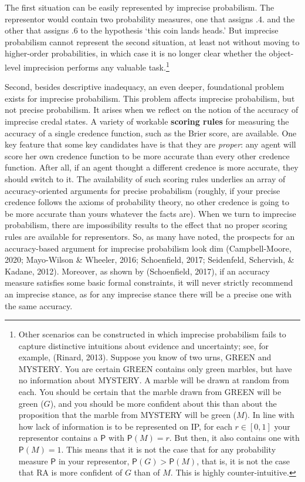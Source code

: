 \documentclass[
  10pt,
  dvipsnames,enabledeprecatedfontcommands]{scrartcl}
\newcommand{\pr}[1]{\mathsf{P}(#1)}
\begin{document}
\noindent The first situation can be easily represented by imprecise
probabilism. The representor would contain two probability measures, one
that assigns .4. and the other that assigns .6 to the hypothesis `this
coin lands heads.' But imprecise probabilism cannot represent the second
situation, at least not without moving to higher-order probabilities, in
which case it is no longer clear whether the object-level imprecision
performs any valuable task.\footnote{Other scenarios can be constructed
  in which imprecise probabilism fails to capture distinctive intuitions
  about evidence and uncertainty; see, for example, (Rinard, 2013).
  Suppose you know of two urns, \textsf{GREEN} and \textsf{MYSTERY}. You
  are certain \textsf{GREEN} contains only green marbles, but have no
  information about \textsf{MYSTERY}. A marble will be drawn at random
  from each. You should be certain that the marble drawn from
  \textsf{GREEN} will be green (\(G\)), and you should be more confident
  about this than about the proposition that the marble from
  \textsf{MYSTERY} will be green (\(M\)). In line with how lack of
  information is to be represented on \textsf{IP}, for each
  \(r\in [0,1]\) your representor contains a \(\mathsf{P}\) with
  \(\pr{M}=r\). But then, it also contains one with \(\pr{M}=1\). This
  means that it is not the case that for any probability measure
  \(\mathsf{P}\) in your representor, \(\mathsf{P}(G) > \mathsf{P}(M)\),
  that is, it is not the case that RA is more confident of \(G\) than of
  \(M\). This is highly counter-intuitive.}

Second, besides descriptive inadequacy, an even deeper, foundational
problem exists for imprecise probabilism. This problem affects imprecise
probabilism, but not precise probabilism. It arises when we reflect on
the notion of the accuracy of imprecise credal states. A variety of
workable \textbf{scoring rules} for measuring the accuracy of a single
credence function, such as the Brier score, are available. One key
feature that some key candidates have is that they are \emph{proper}:
any agent will score her own credence function to be more accurate than
every other credence function. After all, if an agent thought a
different credence is more accurate, they should switch to it. The
availability of such scoring rules underlies an array of
accuracy-oriented arguments for precise probabilism (roughly, if your
precise credence follows the axioms of probability theory, no other
credence is going to be more accurate than yours whatever the facts
are). When we turn to imprecise probabilism, there are impossibility
results to the effect that no proper scoring rules are available for
representors. So, as many have noted, the prospects for an
accuracy-based argument for imprecise probabilism look dim
(Campbell-Moore, 2020; Mayo-Wilson \& Wheeler, 2016; Schoenfield, 2017;
Seidenfeld, Schervish, \& Kadane, 2012). Moreover, as shown by
(Schoenfield, 2017), if an accuracy measure satisfies some basic formal
constraints, it will never strictly recommend an imprecise stance, as
for any imprecise stance there will be a precise one with the same
accuracy.
\end{document}
